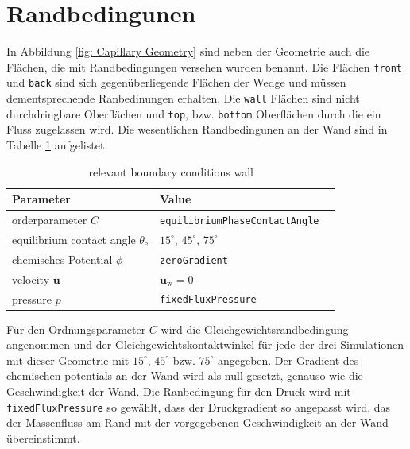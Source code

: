 \section{Randbedingunen}
In Abbildung \ref{fig: Capillary Geometry} sind neben der Geometrie auch die Flächen, die mit Randbedingungen versehen wurden benannt. Die Flächen \texttt{front} und \texttt{back} sind sich gegenüberliegende Flächen der Wedge und müssen dementsprechende Ranbedinungen erhalten. Die \texttt{wall} Flächen sind nicht durchdringbare Oberflächen und \texttt{top}, bzw. \texttt{bottom} Oberflächen durch die ein Fluss zugelassen wird.
Die wesentlichen Randbedingunen an der Wand sind in Tabelle \ref{tab: BoundaryConditions_wall} aufgelistet. 

\begin{table}[h]
    \centering
        \caption{relevant boundary conditions wall}
        \label{tab: BoundaryConditions_wall}
        \begin{tabular}{lll}
            Parameter & Value \\ \hline
            orderparameter $C$ & \texttt{equilibriumPhaseContactAngle}     \\
            equilibrium contact angle $\theta_{\mathrm{e}}$ & $15^{\circ}$, $45^{\circ}$, $75^{\circ}$\\
            chemisches Potential $\phi$   & \texttt{zeroGradient}        \\ 
            velocity $\mathbf{u}$ &   $\mathbf{u_{\mathrm{w}}} = 0$\\
            pressure $p$&  \texttt{fixedFluxPressure} \\
        \end{tabular}
\end{table}
Für den Ordnungsparameter $C$ wird die Gleichgewichtsrandbedingung angenommen und der Gleichgewichtskontaktwinkel für jede der drei Simulationen mit dieser Geometrie mit $15^{\circ}$, $45^{\circ}$ bzw. $75^{\circ}$ angegeben. Der Gradient des chemischen potentials an der Wand wird als null gesetzt, genauso wie die Geschwindigkeit der Wand. Die Ranbedingung für den Druck wird mit \texttt{fixedFluxPressure} so gewählt, dass der Druckgradient so angepasst wird, das der Massenfluss am Rand mit der vorgegebenen Geschwindigkeit an der Wand übereinstimmt. 

